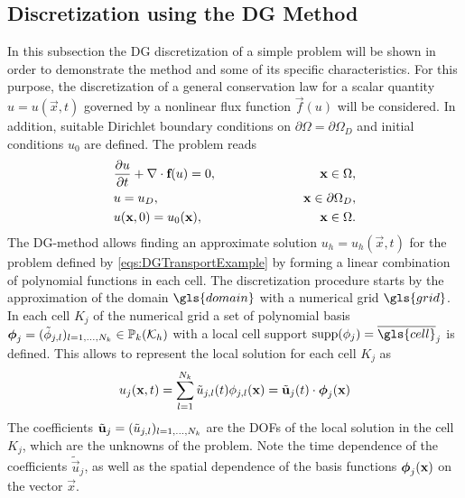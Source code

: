 \subsection{Discretization using the DG Method} \label{sec:DiscWithDG}
In this subsection the DG discretization of a simple problem will be shown in order to demonstrate the method and some of its specific characteristics. For this purpose, the discretization of a general conservation law for a scalar quantity $u = u(\vec{x},t)$ governed by a nonlinear flux function $\vec{f}(u)$ will be considered. In addition, suitable Dirichlet boundary conditions on $\partial \Omega = \partial \Omega_D$ and initial conditions $u_0$ are defined. The problem reads
\begin{subequations}
\begin{align}
&\frac{\partial u}{\partial t} + \nabla \cdot \textbf{f}(u) = 0, \qquad\qquad\qquad &\textbf{x} \in \Omega,\label{eq:consEqDG}\\
&u = u_D, \qquad \qquad \qquad  &\textbf{x} \in \partial \Omega_D,\\
&u(\textbf{x},0) = u_0(\textbf{x}), \qquad\qquad\qquad &\textbf{x}\in\Omega.
\end{align}\label{eqs:DGTransportExample}
\end{subequations}
The DG-method allows finding an approximate solution $u_h = u_h(\vec{x},t)$ for the problem defined by \cref{eqs:DGTransportExample} by forming a linear combination of polynomial functions in each cell.  The discretization procedure starts by the approximation of the domain $\gls{domain}$ with a numerical grid $\gls{grid}$. In each cell $K_j$ of the numerical grid a set of polynomial basis $\boldsymbol{\mathbf{\phi}}_j = (\tilde{\phi}_{j,l})_{l=1,\dots,N_k} \in \mathbb{P}_k(\mathcal{K}_h)$ with a local cell support $\text{supp}(\phi_j) = \overline{\gls{cell}}_j$ is defined. This allows to represent the local solution for each cell $K_j$ as
\begin{equation}
u_j(\textbf{x},t) = \sum_{l=1}^{N_k}\tilde{u}_{j,l}(t)\phi_{j,l}(\textbf{x}) = \tilde{\textbf{u}}_j(t) \cdot \boldsymbol{\mathbf{\phi}}_j (\textbf{x})\label{eq:DGAnsatz}
\end{equation}
The coefficients $\tilde{\boldsymbol{\mathbf{u}}}_j = (\tilde{u}_{j,l})_{l=1,\dots,N_k}$ are the \gls{DOFs} of the local solution in the cell $K_j$, which are the unknowns of the problem. Note the time dependence of the coefficients $\tilde{\vec{u}}_j$, as well as the spatial dependence of the basis functions $\boldsymbol{\mathbf{\phi}}_j (\textbf{x})$ on the vector $\vec{x}$. 

